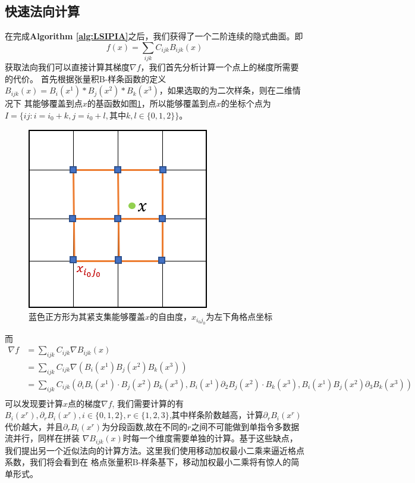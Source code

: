 \subsection{快速法向计算}
在完成\textbf{Algorithm \ref{alg:LSIPIA}}之后，我们获得了一个二阶连续的隐式曲面。即
\begin{equation}
    f(x) = \sum_{ijk} C_{ijk}B_{ijk}(x)
\end{equation}
获取法向我们可以直接计算其梯度$\nabla f$，我们首先分析计算一个点上的梯度所需要的代价。
首先根据张量积B-样条函数的定义$B_{ijk}(x) = B_i(x^1) * B_j(x^2) * B_k(x^3)$，如果选取的为二次样条，则在二维情况下
其能够覆盖到点$x$的基函数如图\ref{fig:2D basis}，所以能够覆盖到点$x$的坐标个点为$I = \{ij: i = i_0 + k, j = i_0 + l, \text{其中}k, l \in \{0,1,2\}\}$。
\begin{figure}[htbp]
    \centering
    \includegraphics[scale=1.0]{./images/image9.png}
    \caption{蓝色正方形为其紧支集能够覆盖$x$的自由度，$x_{i_0j_0}$为左下角格点坐标}
    \label{fig:2D basis}
\end{figure}

而
\begin{equation}
    \begin{split}
        \nabla f &= \sum_{ijk} C_{ijk} \nabla B_{ijk}(x)\\
        &= \sum_{ijk} C_{ijk} \nabla (B_i(x^1)B_j(x^2)B_k(x^3))\\
        &= \sum_{ijk} C_{ijk} (\partial_i B_i(x^1) \cdot B_j(x^2)B_k(x^3), B_i(x^1)\partial_2 B_j(x^2)\cdot B_k(x^3), B_i(x^1)B_j(x^2)\partial_3B_k(x^3))\\
    \end{split}
\end{equation}
可以发现要计算$x$点的梯度$\nabla f$, 我们需要计算的有$B_i(x^r),\partial_r B_i(x^r), i \in \{0,1,2\}, r \in \{1,2,3\}$,其中样条阶数越高，计算$\partial_r B_i(x^r)$代价越大，并且$\partial_r B_i(x^r)$为分段函数,故在不同的$r$之间不可能做到单指令多数据流并行，同样在拼装
$\nabla B_{ijk}(x)$时每一个维度需要单独的计算。基于这些缺点，我们提出另一个近似法向的计算方法。这里我们使用移动加权最小二乘来逼近格点系数，我们将会看到在
格点张量积B-样条基下，移动加权最小二乘将有惊人的简单形式。

